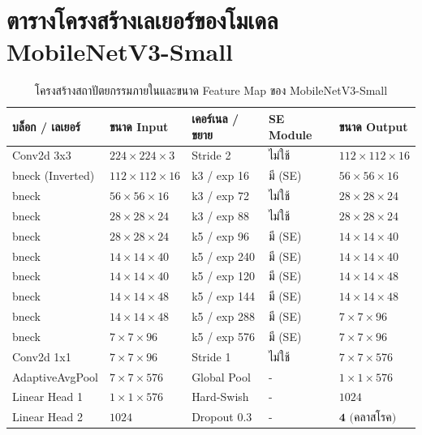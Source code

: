 \section{ตารางโครงสร้างเลเยอร์ของโมเดล MobileNetV3-Small}

\begin{table}[H]
\caption{โครงสร้างสถาปัตยกรรมภายในและขนาด Feature Map ของ MobileNetV3-Small}
\label{tab:app_b_layers}
\begin{tabularx}{\textwidth}{L{3.4cm}C{2.4cm}C{2.4cm}C{2.0cm}Z}
\toprule
\textbf{บล็อก / เลเยอร์} & \textbf{ขนาด Input} & \textbf{เคอร์เนล / ขยาย} & \textbf{SE Module} & \textbf{ขนาด Output} \\
\midrule
Conv2d 3x3 & $224 \times 224 \times 3$ & Stride 2 & ไม่ใช้ & $112 \times 112 \times 16$ \\
bneck (Inverted) & $112 \times 112 \times 16$ & k3 / exp 16 & มี (SE) & $56 \times 56 \times 16$ \\
bneck & $56 \times 56 \times 16$ & k3 / exp 72 & ไม่ใช้ & $28 \times 28 \times 24$ \\
bneck & $28 \times 28 \times 24$ & k3 / exp 88 & ไม่ใช้ & $28 \times 28 \times 24$ \\
bneck & $28 \times 28 \times 24$ & k5 / exp 96 & มี (SE) & $14 \times 14 \times 40$ \\
bneck & $14 \times 14 \times 40$ & k5 / exp 240 & มี (SE) & $14 \times 14 \times 40$ \\
bneck & $14 \times 14 \times 40$ & k5 / exp 120 & มี (SE) & $14 \times 14 \times 48$ \\
bneck & $14 \times 14 \times 48$ & k5 / exp 144 & มี (SE) & $14 \times 14 \times 48$ \\
bneck & $14 \times 14 \times 48$ & k5 / exp 288 & มี (SE) & $7 \times 7 \times 96$ \\
bneck & $7 \times 7 \times 96$ & k5 / exp 576 & มี (SE) & $7 \times 7 \times 96$ \\
Conv2d 1x1 & $7 \times 7 \times 96$ & Stride 1 & ไม่ใช้ & $7 \times 7 \times 576$ \\
AdaptiveAvgPool & $7 \times 7 \times 576$ & Global Pool & - & $1 \times 1 \times 576$ \\
Linear Head 1 & $1 \times 1 \times 576$ & Hard-Swish & - & $1024$ \\
Linear Head 2 & $1024$ & Dropout 0.3 & - & $\mathbf{4} \text{ (คลาสโรค)}$ \\
\bottomrule
\end{tabularx}
\end{table}
